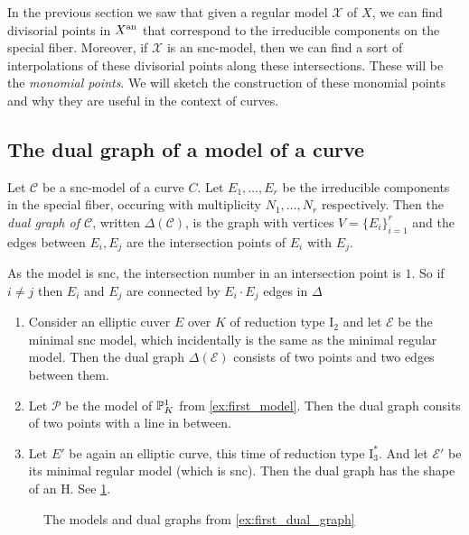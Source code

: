 In the previous section we saw that given a regular model $\mathscr X$ of $X$, we can find divisorial points in $X{}^{\text{an}}$ that correspond to the irreducible components on the special fiber.  
Moreover, if $\mathscr X$ is an snc-model, then we can find a sort of interpolations of these divisorial points along these intersections. 
These will be the \emph{monomial points}. 
We will sketch the construction of these monomial points and why they are useful in the context of curves. 

\subsection{The dual graph of a model of a curve} \label{sec:the_dual_graph_of_a_model_of_a_curve}
\begin{definition}
	Let $\mathscr C$ be a snc-model of a curve $C$.
	Let $E_1, \ldots, E_r$ be the irreducible components in the special fiber, occuring with multiplicity $N_1, \ldots, N_r$ respectively. 
	Then the \emph{dual graph of $\mathscr C$}, written $\Delta(\mathscr C)$, is the graph with vertices $V = \{E_i\}_{i = 1}^{r} $ and the edges between $E_i, E_j$ are the intersection points of $E_i$ with $E_j$. 
\end{definition}
As the model is snc, the intersection number in an intersection point is  $1$. 
So if $i \ne j$ then $E_i$ and $E_j$ are connected by $E_i \cdot E_j$ edges in $\Delta$
\begin{example}\label{ex:first_dual_graph}
	\begin{enumerate}
		\item Consider an elliptic cuver $E$ over $K$ of reduction type $\mathrm I_2$ and let $\mathscr E$ be the minimal snc model, which incidentally is the same as the minimal regular model. 
			Then the dual graph $\Delta(\mathscr E)$ consists of two points and two edges between them.
		\item Let $\mathscr P$ be the model of $\mathbb{P}_K^{1}$ from \cref{ex:first_model}. 
			Then the dual graph consits of two points with a line in between. 
		\item Let $E'$ be again an elliptic curve, this time of reduction type $\mathrm I_3^*$. 
			And let $\mathscr E'$ be its minimal regular model (which is snc). 
			Then the dual graph has the shape of an H. See \cref{fig:example_dual_graph}.

	\end{enumerate}
\end{example}

\begin{figure}[h]
    \centering
    \caption{The models and dual graphs from \cref{ex:first_dual_graph}}
    \label{fig:example_dual_graph}
\end{figure}

